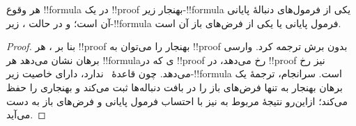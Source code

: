 \documentclass[../../../include/open-logic-section]{subfiles}
\begin{document}
\begin{cor}
هر وقوع !!{formula} در یک !!{proof} بهنجار  زیر-!!{formula}
یکی از فرمول‌های دنبالهٔ پایانی آن است؛ و در حالت ،
زیر-!!{formula} فرمول پایانی یا یکی از فرض‌های باز آن است.
\end{cor}

\begin{proof}
  بنا بر ، هر !!{proof} بهنجار
   را می‌توان به !!{proof} بدون برش  ترجمه کرد.
  وارسی برهان نشان می‌دهد هر !!{formula}ی که در !!{proof} 
  رخ می‌دهد، در !!{proof}  نیز رخ می‌دهد.  چون
  قاعدهٔ~\Cut{} ندارد، دارای خاصیت زیر-!!{formula} است. سرانجام، ترجمهٔ
  یک برهان بهنجار  به  تنها فرض‌های باز را در
  بافت دنباله‌ها ثبت می‌کند و بهنجاری را حفظ می‌کند؛ ازاین‌رو نتیجهٔ
  مربوط به  نیز با احتساب فرمول پایانی و فرض‌های باز به دست
  می‌آید.
\end{proof}
\end{document}
